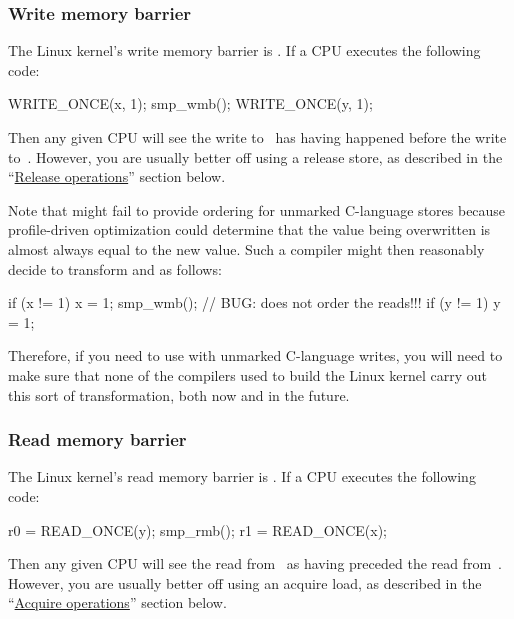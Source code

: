 \subsubsection{Write memory barrier}

The Linux kernel's write memory barrier is .
If a CPU executes the following code:

\begin{VerbatimU}
	WRITE_ONCE(x, 1);
	smp_wmb();
	WRITE_ONCE(y, 1);
\end{VerbatimU}

Then any given CPU will see the write to~ has having happened before
the write to~.  However, you are usually better off using a release
store, as described in the
``\hyperref[sec:docs:ordering:Release operations]{Release operations}''
section below.

Note that  might fail to provide ordering for unmarked C-language
stores because profile-driven optimization could determine that the
value being overwritten is almost always equal to the new value.
Such a compiler might then reasonably decide to transform  and
 as follows:

\begin{VerbatimU}
	if (x != 1)
		x = 1;
	smp_wmb(); // BUG: does not order the reads!!!
	if (y != 1)
		y = 1;
\end{VerbatimU}

Therefore, if you need to use  with unmarked C-language writes,
you will need to make sure that none of the compilers used to build
the Linux kernel carry out this sort of transformation, both now and in
the future.


\subsubsection{Read memory barrier}

The Linux kernel's read memory barrier is .
If a CPU executes the following code:

\begin{VerbatimU}
	r0 = READ_ONCE(y);
	smp_rmb();
	r1 = READ_ONCE(x);
\end{VerbatimU}

Then any given CPU will see the read from~ as having preceded the read
from~.
However, you are usually better off using an acquire load, as described
in the
``\hyperref[sec:docs:ordering:Acquire operations]{Acquire operations}''
section below.

